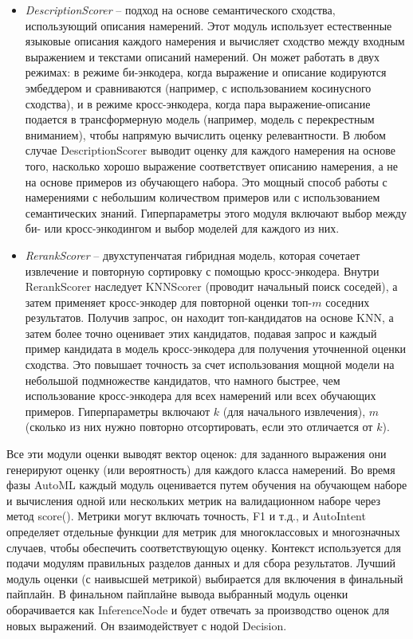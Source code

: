 \documentclass[14pt,a4paper,oneside,openany]{extbook}
\begin{document}
\begin{itemize}
\item \emph{DescriptionScorer} -- подход на основе семантического сходства, использующий описания намерений. Этот модуль использует естественные языковые описания каждого намерения и вычисляет сходство между входным выражением и текстами описаний намерений. Он может работать в двух режимах: в режиме би-энкодера, когда выражение и описание кодируются эмбеддером и сравниваются (например, с использованием косинусного сходства), и в режиме кросс-энкодера, когда пара выражение-описание подается в трансформерную модель (например, модель с перекрестным вниманием), чтобы напрямую вычислить оценку релевантности. В любом случае DescriptionScorer выводит оценку для каждого намерения на основе того, насколько хорошо выражение соответствует описанию намерения, а не на основе примеров из обучающего набора. Это мощный способ работы с намерениями с небольшим количеством примеров или с использованием семантических знаний. Гиперпараметры этого модуля включают выбор между би- или кросс-энкодингом и выбор моделей для каждого из них.

\item \emph{RerankScorer} -- двухступенчатая гибридная модель, которая сочетает извлечение и повторную сортировку с помощью кросс-энкодера. Внутри RerankScorer наследует KNNScorer (проводит начальный поиск соседей), а затем применяет кросс-энкодер для повторной оценки топ-\(m\) соседних результатов. Получив запрос, он находит топ-кандидатов на основе KNN, а затем более точно оценивает этих кандидатов, подавая запрос и каждый пример кандидата в модель кросс-энкодера для получения уточненной оценки сходства. Это повышает точность за счет использования мощной модели на небольшой подмножестве кандидатов, что намного быстрее, чем использование кросс-энкодера для всех намерений или всех обучающих примеров. Гиперпараметры включают \(k\) (для начального извлечения), \(m\) (сколько из них нужно повторно отсортировать, если это отличается от \(k\)).
\end{itemize}

Все эти модули оценки выводят вектор оценок: для заданного выражения они генерируют оценку (или вероятность) для каждого класса намерений. Во время фазы AutoML каждый модуль оценивается путем обучения на обучающем наборе и вычисления одной или нескольких метрик на валидационном наборе через метод score(). Метрики могут включать точность, F1 и т.д., и AutoIntent определяет отдельные функции для метрик для многоклассовых и многозначных случаев, чтобы обеспечить соответствующую оценку. Контекст используется для подачи модулям правильных разделов данных и для сбора результатов. Лучший модуль оценки (с наивысшей метрикой) выбирается для включения в финальный пайплайн. В финальном пайплайне вывода выбранный модуль оценки оборачивается как InferenceNode и будет отвечать за производство оценок для новых выражений. Он взаимодействует с нодой Decision.
\end{document}
